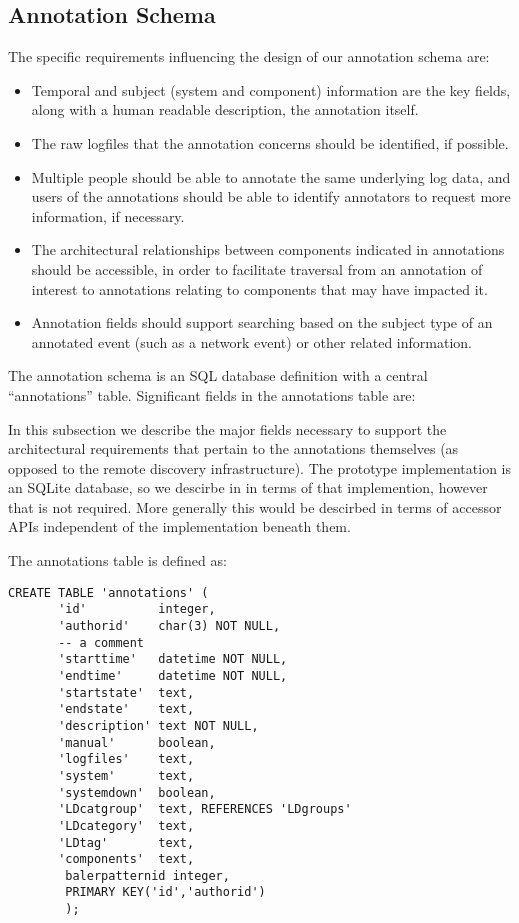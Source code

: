 \subsection{Annotation Schema}

The specific requirements influencing the design of our annotation schema
are:

\begin{itemize}
\item Temporal and subject (system and component) information are 
      the key fields, along with a human readable description, the 
      annotation itself.
\item The raw logfiles that the annotation concerns should be identified,
      if possible.
\item Multiple people should be able to annotate the same underlying 
      log data, and users of the annotations should be able to 
      identify annotators to request more information, if necessary.  
\item The architectural relationships between components indicated in 
      annotations should be accessible, in order to facilitate 
      traversal from an annotation of interest to annotations relating to
      components that may have impacted it.
\item Annotation fields should support searching based on the subject type 
      of an annotated event (such as a network event) or other 
      related information.
\end{itemize}

The annotation schema is an SQL database definition with a central ``annotations'' table. Significant fields in the annotations table are:


In this subsection we describe the major fields necessary to support the
architectural requirements that pertain to the annotations themselves
(as opposed to the remote discovery infrastructure). The prototype
implementation is an SQLite database, so we descirbe in in terms
of that implemention, however that is not required. More generally
this would be descirbed in terms of accessor APIs independent of
the implementation beneath them.

The annotations table is defined as:
\begin{small}
\begin{verbatim}
CREATE TABLE 'annotations' (
       'id'          integer,
       'authorid'    char(3) NOT NULL,
       -- a comment
       'starttime'   datetime NOT NULL,
       'endtime'     datetime NOT NULL,
       'startstate'  text,
       'endstate'    text,
       'description' text NOT NULL,
       'manual'      boolean,
       'logfiles'    text,
       'system'      text,
       'systemdown'  boolean,
       'LDcatgroup'  text, REFERENCES 'LDgroups'
       'LDcategory'  text,
       'LDtag'       text,
       'components'  text,
        balerpatternid integer,
        PRIMARY KEY('id','authorid')
        );
\end{verbatim}
\end{small}

